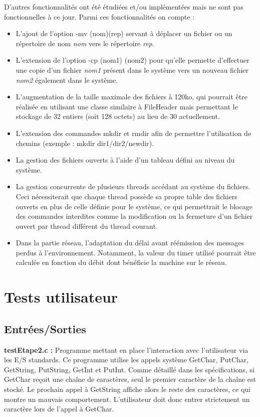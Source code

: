 \documentclass[12pt]{report}
\begin{document}
D'autres fonctionnalités ont été étudiées et/ou implémentées mais ne sont pas fonctionnelles à ce jour.
Parmi ces fonctionnalités on compte :
\bigskip
\begin{itemize}\renewcommand{\labelitemi}{$\bullet$}
\item L'ajout de l'option -mv (nom)(rep) servant à déplacer un fichier ou un répertoire de nom \textit{nom} vers le répertoire \textit{rep}.\bigskip
\item L'extension de l'option -cp (nom1) (nom2) pour qu'elle permette d'effectuer une copie d'un fichier \textit{nom1} présent dans le système vers un nouveau fichier \textit{nom2} également dans le système.\bigskip
\item L'augmentation de la taille maximale des fichiers à 120ko, qui pourrait être réalisée en utilisant une classe similaire à FileHeader mais permettant le stockage de 32 entiers (soit 128 octets) au lieu de 30 actuellement.\bigskip
\item L'extension des commandes mkdir et rmdir afin de permettre l'utilisation de chemins (exemple : mkdir dir1/dir2/newdir).\bigskip
\item La gestion des fichiers ouverts à l'aide d'un tableau défini au niveau du système.\bigskip
\item La gestion concurrente de plusieurs threads accédant au système du fichiers. Ceci nécessiterait que chaque thread possède sa propre table des fichiers ouverts en plus de celle définie pour le système, ce qui permettrait le blocage des commandes interdites comme la modification ou la fermeture d'un fichier ouvert par thread différent du thread courant.\bigskip
\item Dans la partie réseau, l'adaptation du délai avant réémission des messages perdus à l'environnement. Notamment, la valeur du timer utilisé pourrait être calculée en fonction du débit dont bénéficie la machine sur le réseau.
\end{itemize}




\chapter{Tests utilisateur}

\section{Entrées/Sorties}

\textbf{testEtape2.c :} Programme mettant en place l'interaction avec l'utilisateur via les E/S standards. Ce programme utilise les appels système GetChar, PutChar, GetString, PutString, GetInt et PutInt. Comme détaillé dans les spécifications, si GetChar reçoit une chaîne de caractères, seul le premier caractère de la chaîne est stocké. Le prochain appel à GetString affiche alors le reste des caractères, ce qui montre un mauvais comportement. L'utilisateur doit donc entrer strictement un caractère lors de l'appel à GetChar.
\bigskip
\end{document}
